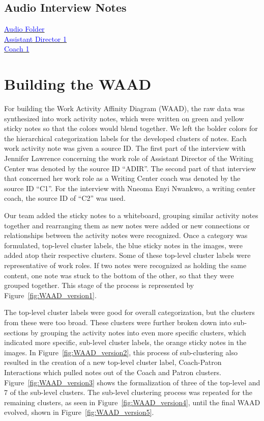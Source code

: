 \documentclass[12pt]{article} %
\begin{document}
  \subsection*{Audio Interview Notes} %
  \href{http://www.dropbox.specialorange.com/vt/5714%20UX/}{\textcolor{blue}{Audio Folder}}\\
  \href{http://www.dropbox.specialorange.com/vt/5714%20UX/ADir1.aac}{\textcolor{blue}{Assistant Director 1}}\\
  \hspace{1.5cm}\href{http://www.dropbox.specialorange.com/vt/5714%20UX/C1.aac}{\textcolor{blue}{Coach 1}}\\

\section{Building the WAAD} %
  For building the Work Activity Affinity Diagram (WAAD), the raw data was synthesized into work activity notes, which were written on green and yellow sticky notes so that the colors would blend together.
  We left the bolder colors for the hierarchical categorization labels for the developed clusters of notes.  Each work activity note was given a source ID.
  The first part of the interview with Jennifer Lawrence concerning the work role of Assistant Director of the Writing Center was denoted by the source ID “ADIR”.
  The second part of that interview that concerned her work role as a Writing Center coach was denoted by the source ID “C1”.
  For the interview with Nneoma Enyi Nwankwo, a writing center coach, the source ID of “C2” was used. 

  Our team added the sticky notes to a whiteboard, grouping similar activity notes together and rearranging them as new notes were added or new connections or relationships between the activity notes were recognized.
  Once a category was formulated, top-level cluster labels, the blue sticky notes in the images, were added atop their respective clusters.
  Some of these top-level cluster labels were representative of work roles.
  If two notes were recognized as holding the same content, one note was stuck to the bottom of the other, so that they were grouped together.
  This stage of the process is represented by Figure~\ref{fig:WAAD_version1}. 

  The top-level cluster labels were good for overall categorization, but the clusters from these were too broad.
  These clusters were further broken down into sub-sections by grouping the activity notes into even more specific clusters, which indicated more specific, sub-level cluster labels, the orange sticky notes in the images.
  In Figure~\ref{fig:WAAD_version2}, this process of sub-clustering also resulted in the creation of a new top-level cluster label, Coach-Patron Interactions which pulled notes out of the Coach and Patron clusters.
  Figure~\ref{fig:WAAD_version3} shows the formalization of three of the top-level and 7 of the sub-level clusters.
  The sub-level clustering process was repeated for the remaining clusters, as seen in Figure~\ref{fig:WAAD_version4}, until the final WAAD evolved, shown in Figure~\ref{fig:WAAD_version5}.
\end{document}
